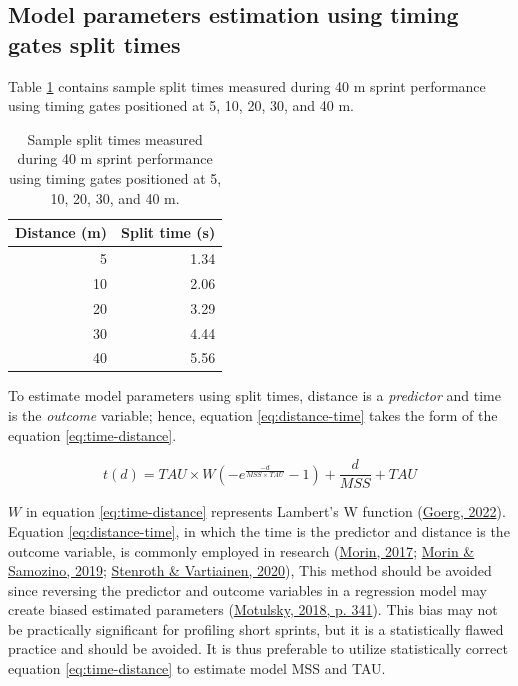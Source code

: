 \documentclass[fleqn,10pt]{wlpeerj} %
\begin{document}
\hypertarget{model-parameters-estimation-using-timing-gates-split-times}{%
\subsection{Model parameters estimation using timing gates split times}\label{model-parameters-estimation-using-timing-gates-split-times}}

Table \ref{tab:example-split-times} contains sample split times measured during 40 m sprint performance using timing gates positioned at 5, 10, 20, 30, and 40 m.



\begin{table}

\caption{\label{tab:example-split-times}Sample split times measured during 40 m sprint performance using timing gates positioned at 5, 10, 20, 30, and 40 m.}
\centering
\begin{tabular}[t]{rr}
\toprule
Distance (m) & Split time (s)\\
\midrule
5 & 1.34\\
10 & 2.06\\
20 & 3.29\\
30 & 4.44\\
40 & 5.56\\
\bottomrule
\end{tabular}
\end{table}

To estimate model parameters using split times, distance is a \emph{predictor} and time is the \emph{outcome} variable; hence, equation \eqref{eq:distance-time} takes the form of the equation \eqref{eq:time-distance}.

\begin{equation}
  t(d) = TAU \times W(-e^{\frac{-d}{MSS \times TAU}} - 1) + \frac{d}{MSS} + TAU \label{eq:time-distance}
\end{equation}

\(W\) in equation \eqref{eq:time-distance} represents Lambert's W function (\protect\hyperlink{ref-R-LambertW}{Goerg, 2022}). Equation \eqref{eq:distance-time}, in which the time is the predictor and distance is the outcome variable, is commonly employed in research (\protect\hyperlink{ref-morinSpreadsheetSprintAcceleration2017}{Morin, 2017}; \protect\hyperlink{ref-morinSpreadsheetSprintAcceleration2019}{Morin \& Samozino, 2019}; \protect\hyperlink{ref-stenrothSpreadsheetSprintAcceleration2020}{Stenroth \& Vartiainen, 2020}), This method should be avoided since reversing the predictor and outcome variables in a regression model may create biased estimated parameters (\protect\hyperlink{ref-motulskyIntuitiveBiostatisticsNonmathematical2018}{Motulsky, 2018, p. 341}). This bias may not be practically significant for profiling short sprints, but it is a statistically flawed practice and should be avoided. It is thus preferable to utilize statistically correct equation \eqref{eq:time-distance} to estimate model MSS and TAU.
\end{document}
